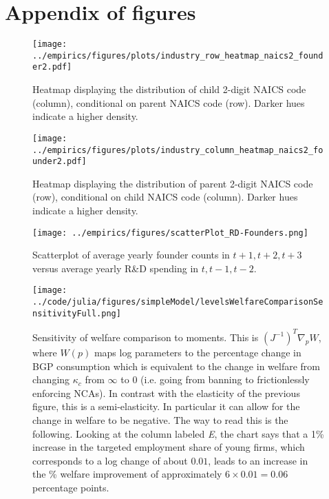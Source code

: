 \documentclass[11pt,english]{article}
\theoremstyle{remark}
\begin{document}
\newpage
\section{Appendix of figures}

\begin{figure}[!htb]
	\centering
	\texttt{[image: ../empirics/figures/plots/industry\_row\_heatmap\_naics2\_founder2.pdf]}
	\caption{Heatmap displaying the distribution of child 2-digit NAICS code (column), conditional on parent NAICS code (row). Darker hues indicate a higher density.}
	\label{figure:industry_row_heatmap_naics2_founder2}
\end{figure}

\begin{figure}[!htb]
	\centering
	\texttt{[image: ../empirics/figures/plots/industry\_column\_heatmap\_naics2\_founder2.pdf]}
	\caption{Heatmap displaying the distribution of parent 2-digit NAICS code (row), conditional on child NAICS code (column). Darker hues indicate a higher density.}
	\label{figure:industry_column_heatmap_naics2_founder2}
\end{figure}

\begin{figure}[!htb]
	\centering
	\texttt{[image: ../empirics/figures/scatterPlot\_RD-Founders.png]}
	\caption{Scatterplot of average yearly founder counts in $t+1,t+2,t+3$ versus average yearly R\&D spending in $t,t-1,t-2$.}
	\label{figure:scatterPlot_RD-Founders}
\end{figure}

\begin{figure}[!htb]
	\texttt{[image: ../code/julia/figures/simpleModel/levelsWelfareComparisonSensitivityFull.png]}
	\caption{Sensitivity of welfare comparison to moments. This is $(J^{-1})^T \nabla_p W$, where $W(p)$ maps log parameters to the percentage change in BGP consumption which is equivalent to the change in welfare from changing $\kappa_c$ from $\infty$ to $0$ (i.e. going from banning to frictionlessly enforcing NCAs). In contrast with the elasticity of the previous figure, this is a semi-elasticity. In particular it can allow for the change in welfare to be negative. The way to read this is the following. Looking at the column labeled \textit{E}, the chart says that a 1\% increase in the targeted employment share of young firms, which corresponds to a log change of about $0.01$, leads to an increase in the \% welfare improvement of approximately $6 \times 0.01 = 0.06$ percentage points.}
	\label{levelsWelfareComparisonSensitivityFull}
\end{figure}
\end{document}
